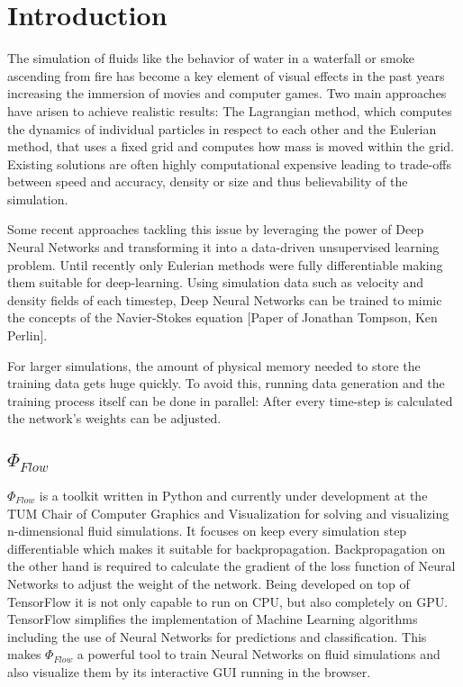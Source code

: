 \chapter{Introduction}\label{chapter:introduction}
The simulation of fluids like the behavior of water in a waterfall or smoke ascending from fire has become a key element of visual effects in the past years increasing the immersion of movies and computer games. Two main approaches have arisen to achieve realistic results: The Lagrangian method, which computes the dynamics of individual particles in respect to each other and the Eulerian method, that uses a fixed grid and computes how mass is moved within the grid. Existing solutions are often highly computational expensive leading to trade-offs between speed and accuracy, density or size and thus believability of the simulation.\par
Some recent approaches tackling this issue by leveraging the power of Deep Neural Networks and transforming it into a data-driven unsupervised learning problem. Until recently only Eulerian methods were fully differentiable making them suitable for deep-learning. Using simulation data such as velocity and density fields of each timestep, Deep Neural Networks can be trained to mimic the concepts of the Navier-Stokes equation [Paper of Jonathan Tompson, Ken Perlin].\par
For larger simulations, the amount of physical memory needed to store the training data gets huge quickly. To avoid this, running data generation and the training process itself can be done in parallel: After every time-step is calculated the network's weights can be adjusted.
\section{$\Phi_\textit{Flow}$ }
$\Phi_\textit{Flow}$ is a toolkit written in Python and currently under development at the TUM Chair of Computer Graphics and Visualization for solving and visualizing n-dimensional fluid simulations. It focuses on keep every simulation step differentiable which makes it suitable for backpropagation. Backpropagation on the other hand is required to calculate the gradient of the loss function of Neural Networks to adjust the weight of the network. Being developed on top of TensorFlow it is not only capable to run on CPU, but also completely on GPU. TensorFlow simplifies the implementation of Machine Learning algorithms including the use of Neural Networks for predictions and classification. This makes $\Phi_\textit{Flow}$ a powerful tool to train Neural Networks on fluid simulations and also visualize them by its interactive GUI running in the browser. 
